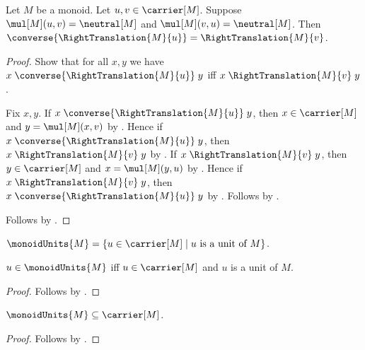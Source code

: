 \begin{lemma}\label{monoid_unit_right_translation_converse}
    Let $M$ be a monoid.
    Let $u,v\in\carrier[M]$.
    Suppose $\mul[M](u,v)=\neutral[M]$ and
        $\mul[M](v,u)=\neutral[M]$.
    Then $\converse{\RightTranslation{M}{u}}
        =\RightTranslation{M}{v}$.
\end{lemma}
\begin{proof}
    Show that for all $x,y$ we have
        $x\mathrel{\converse{\RightTranslation{M}{u}}}y$ iff
        $x\mathrel{\RightTranslation{M}{v}}y$.
    \begin{subproof}
        Fix $x,y$.
        If $x\mathrel{\converse{\RightTranslation{M}{u}}}y$, then
            $x\in\carrier[M]$ and $y=\mul[M](x,v)$ by
            .
        Hence if $x\mathrel{\converse{\RightTranslation{M}{u}}}y$, then
            $x\mathrel{\RightTranslation{M}{v}}y$
            by .
        If $x\mathrel{\RightTranslation{M}{v}}y$, then
            $y\in\carrier[M]$ and $x=\mul[M](y,u)$ by
            .
        Hence if $x\mathrel{\RightTranslation{M}{v}}y$, then
            $x\mathrel{\converse{\RightTranslation{M}{u}}}y$
            by .
        Follows by \auto.
    \end{subproof}
    Follows by
        .
\end{proof}

\begin{definition}\label{monoid_units}
    $\monoidUnits{M}=\{u\in\carrier[M]\mid
        \text{$u$ is a unit of $M$}\}$.
\end{definition}

\begin{proposition}\label{monoid_units_iff}
    $u\in\monoidUnits{M}$ iff
        $u\in\carrier[M]$ and $u$ is a unit of $M$.
\end{proposition}
\begin{proof}
    Follows by .
\end{proof}

\begin{proposition}\label{monoid_units_subseteq_carrier}
    $\monoidUnits{M}\subseteq\carrier[M]$.
\end{proposition}
\begin{proof}
    Follows by .
\end{proof}

